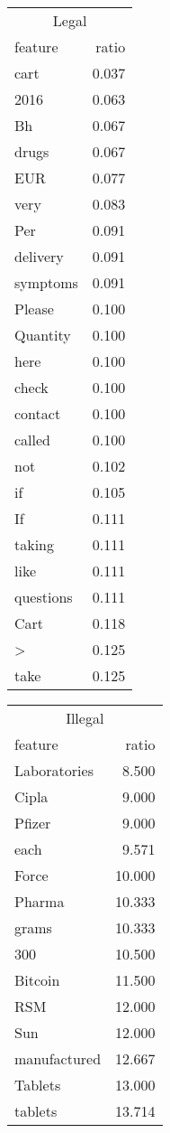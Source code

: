 \documentclass[11pt,a4paper,table]{article}
\begin{document}
\begin{table}
\small
\begin{tabular}{lr}
\multicolumn{2}{c}{Legal}\\
feature & ratio\\
\hline
cart & 0.037\\
2016 & 0.063\\
Bh & 0.067\\
drugs & 0.067\\
EUR & 0.077\\
very & 0.083\\
Per & 0.091\\
delivery & 0.091\\
symptoms & 0.091\\
Please & 0.100\\
Quantity & 0.100\\
here & 0.100\\
check & 0.100\\
contact & 0.100\\
called & 0.100\\
not & 0.102\\
if & 0.105\\
If & 0.111\\
taking & 0.111\\
like & 0.111\\
questions & 0.111\\
Cart & 0.118\\
> & 0.125\\
take & 0.125\\
\end{tabular}
\begin{tabular}{lr}
\multicolumn{2}{c}{Illegal}\\
feature & ratio\\
\hline
Laboratories & 8.500\\
Cipla & 9.000\\
Pfizer & 9.000\\
each & 9.571\\
Force & 10.000\\
Pharma & 10.333\\
grams & 10.333\\
300 & 10.500\\
Bitcoin & 11.500\\
RSM & 12.000\\
Sun & 12.000\\
manufactured & 12.667\\
Tablets & 13.000\\
tablets & 13.714\\

\end{tabular}
\end{table}
\end{document}
